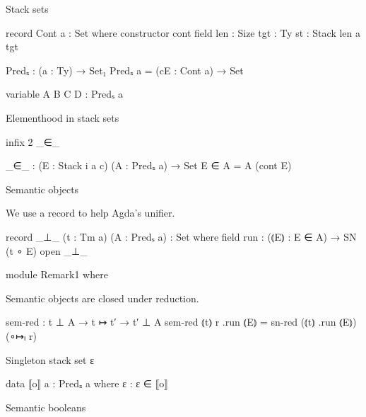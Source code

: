 

Stack sets

\begin{code}
record Cont a : Set where
  constructor cont
  field
    {len}  : Size
    {tgt}  : Ty
    st     : Stack len a tgt

Predₛ : (a : Ty) → Set₁
Predₛ a = (cE : Cont a) → Set

variable A B C D : Predₛ a
\end{code}

Elementhood in stack sets

\begin{code}
infix 2 _∈_

_∈_ : (E : Stack i a c) (A : Predₛ a) → Set
E ∈ A = A (cont E)
\end{code}

Semantic objects

We use a record to help Agda's unifier.

\begin{code}
record _⊥_ (t : Tm a) (A : Predₛ a) : Set where
  field run : (⦅E⦆ : E ∈ A) → SN (t ∘ E)
open _⊥_

module Remark1 where
\end{code}

  Semantic objects are closed under reduction.

\begin{code}
  sem-red : t ⊥ A → t ↦ t′ → t′ ⊥ A
  sem-red ⦅t⦆ r .run ⦅E⦆ = sn-red (⦅t⦆ .run ⦅E⦆) (∘↦ₗ r)
\end{code}

Singleton stack set {ε}

\begin{code}
data ⟦o⟧ {a} : Predₛ a where
  ε : ε ∈ ⟦o⟧
\end{code}

Semantic booleans

